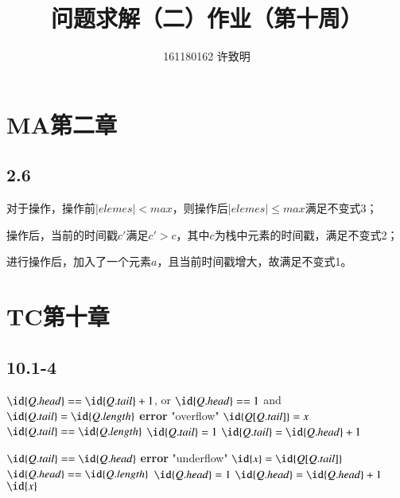 \documentclass[twocolumn]{article}
\begin{document}
	\title{问题求解（二）作业（第十周）}\author{161180162 许致明}\maketitle
	\section*{MA第二章}
	\subsection*{2.6}
	对于操作，操作前$|elemes|<max$，则操作后$|elemes|\le max$满足不变式3；\par 
	操作后，当前的时间戳$c'$满足$c'>c$，其中$c$为栈中元素的时间戳，满足不变式2；\par 
	进行操作后，加入了一个元素$a$，且当前时间戳增大，故满足不变式1。
	\section*{TC第十章}
	\subsection*{10.1-4}
	\begin{codebox}
		\zi{}\li 
		\If $\id{Q.head}==\id{Q.tail}+1$, or\zi
		$\id{Q.head}==1$ and $\id{Q.tail}=\id{Q.length}$
		\Then\li
		\textbf{error} "overflow" \End \li 
		$\id{Q[Q.tail]}=x$\li 
		\If $\id{Q.tail}==\id{Q.length}$\Then\li 
		$\id{Q.tail}=1$\li 
		\Else\li 
		$\id{Q.tail}=\id{Q.head}+1$
	\end{codebox}
	\begin{codebox}
		\zi\proc{Dequeue(\id{Q}, \id{x})}\li 
		\If $\id{Q.tail}==\id{Q.head}$
		\Then\li
		\textbf{error} "underflow" \End \li 
		$\id{x}=\id{Q[Q.tail]}$\li 
		\If $\id{Q.head}==\id{Q.length}$\Then\li 
		$\id{Q.head}=1$\li 
		\Else\li 
		$\id{Q.head}=\id{Q.head}+1$\End\li 
		\Return $\id{x}$
	\end{codebox}
\end{document}

